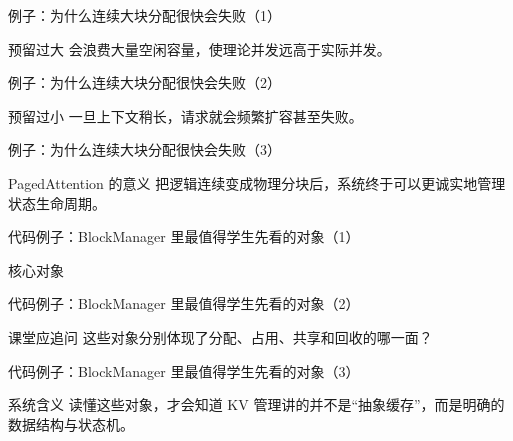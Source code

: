 \begin{frame}{例子：为什么连续大块分配很快会失败（1）}
\begin{block}{预留过大}
    会浪费大量空闲容量，使理论并发远高于实际并发。
  \end{block}
\end{frame}

\begin{frame}{例子：为什么连续大块分配很快会失败（2）}
\begin{block}{预留过小}
    一旦上下文稍长，请求就会频繁扩容甚至失败。
  \end{block}
\end{frame}

\begin{frame}{例子：为什么连续大块分配很快会失败（3）}
\begin{block}{PagedAttention 的意义}
    把逻辑连续变成物理分块后，系统终于可以更诚实地管理状态生命周期。
  \end{block}
\end{frame}

\begin{frame}{代码例子：BlockManager 里最值得学生先看的对象（1）}
\begin{block}{核心对象}
    {\ttfamily\small
    \par
    \par
    \par
    \par
    }
  \end{block}
\end{frame}

\begin{frame}{代码例子：BlockManager 里最值得学生先看的对象（2）}
\begin{block}{课堂应追问}
    这些对象分别体现了分配、占用、共享和回收的哪一面？
  \end{block}
\end{frame}

\begin{frame}{代码例子：BlockManager 里最值得学生先看的对象（3）}
\begin{block}{系统含义}
    读懂这些对象，才会知道 KV 管理讲的并不是“抽象缓存”，而是明确的数据结构与状态机。
  \end{block}
\end{frame}

